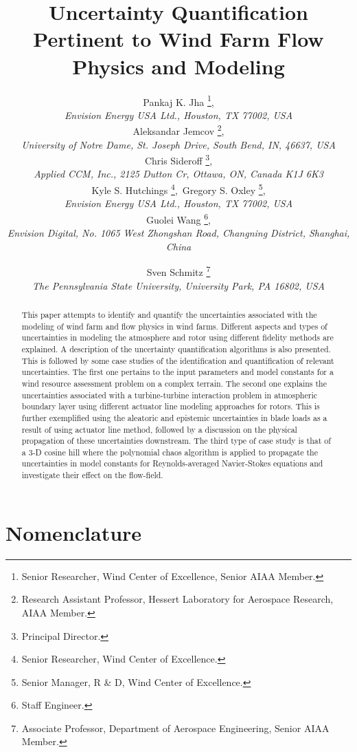 \documentclass[]{aiaa-tc}%
\title{Uncertainty Quantification Pertinent to Wind Farm Flow Physics and Modeling}
\author{
    Pankaj K. Jha%
    \thanks{Senior Researcher, Wind Center of Excellence, Senior AIAA Member.},\\
   {\normalsize\itshape
   Envision Energy USA Ltd., Houston, TX 77002, USA}\\
    Aleksandar Jemcov%
    \thanks{Research Assistant Professor, Hessert Laboratory for Aerospace Research, AIAA Member.},\\
   {\normalsize\itshape
   University of Notre Dame, St. Joseph Drive, South Bend, IN, 46637, USA}\\
    Chris Sideroff%
    \thanks{Principal Director.},\\
   {\normalsize\itshape
   Applied CCM, Inc., 2125 Dutton Cr, Ottawa, ON, Canada K1J 6K3}\\
    Kyle S. Hutchings%
   \thanks{Senior Researcher, Wind Center of Excellence.},\
    Gregory S. Oxley%
   \thanks{Senior Manager, R \& D, Wind Center of Excellence.},\\
  {\normalsize\itshape
   Envision Energy USA Ltd., Houston, TX 77002, USA}\\
 Guolei Wang%
   \thanks{Staff Engineer.},\\
  {\normalsize\itshape
   Envision Digital, No. 1065 West Zhongshan Road, Changning District, Shanghai, China}\\
  \and
  Sven Schmitz %
   \thanks{Associate Professor, Department of Aerospace Engineering, Senior AIAA Member.}\\
  {\normalsize\itshape
  The Pennsylvania State University, University Park, PA 16802, USA}
 }
\begin{document}
\maketitle

\begin{abstract}
This paper attempts to identify and quantify the uncertainties associated with the modeling of wind farm and flow physics in wind farms. Different aspects and types of uncertainties in modeling the atmosphere and rotor using different fidelity methods are explained. A description of the uncertainty quantification algorithms is also presented. This is followed by some case studies of the identification and quantification of relevant uncertainties. The first one pertains to the input parameters and model constants for a wind resource assessment problem on a complex terrain. The second one explains the uncertainties associated with a turbine-turbine interaction problem in atmospheric boundary layer using different actuator line modeling approaches for rotors. This is further exemplified using the aleatoric and epistemic uncertainties in blade loads as a result of using actuator line method, followed by a discussion on the physical propagation of these uncertainties downstream. The third type of case study is that of a 3-D cosine hill where the polynomial chaos algorithm is applied to propagate the uncertainties in model constants for Reynolds-averaged Navier-Stokes equations and investigate their effect on the flow-field.    
\end{abstract}

\section*{Nomenclature}
\end{document}
